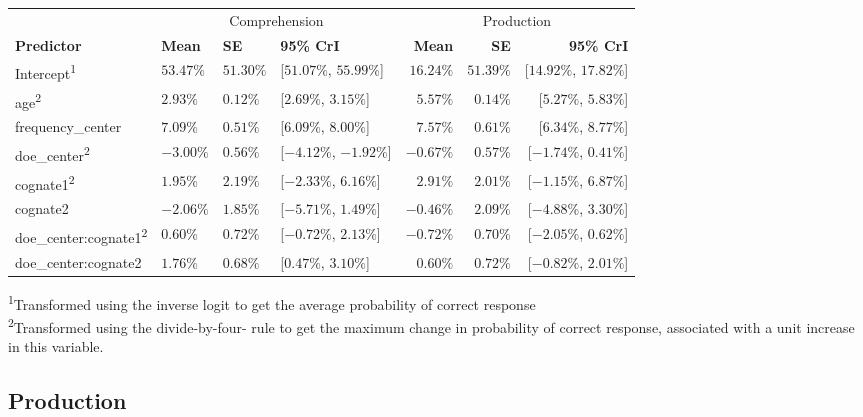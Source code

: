 \documentclass[
  english,
  man,man,floatsintext]{apa6}
\begin{document}
\captionsetup[table]{labelformat=empty,skip=1pt}
\begin{longtable}{llllrrr}
\toprule
& \multicolumn{3}{c}{Comprehension} & \multicolumn{3}{c}{Production} \\ 
 \cmidrule(lr){2-4}\cmidrule(lr){5-7}
\textbf{Predictor} & \textbf{Mean} & \textbf{SE} & \textbf{95\% CrI} & \textbf{Mean} & \textbf{SE} & \textbf{95\% CrI} \\ 
\midrule
Intercept\textsuperscript{1} & $53.47\%$ & $51.30\%$ & [$51.07\%$, $55.99\%$] & $16.24\%$ & $51.39\%$ & [$14.92\%$, $17.82\%$] \\ 
age\textsuperscript{2} & $2.93\%$ & $0.12\%$ & [$2.69\%$, $3.15\%$] & $5.57\%$ & $0.14\%$ & [$5.27\%$, $5.83\%$] \\ 
frequency\_center & $7.09\%$ & $0.51\%$ & [$6.09\%$, $8.00\%$] & $7.57\%$ & $0.61\%$ & [$6.34\%$, $8.77\%$] \\ 
doe\_center\textsuperscript{2} & $-3.00\%$ & $0.56\%$ & [$-4.12\%$, $-1.92\%$] & $-0.67\%$ & $0.57\%$ & [$-1.74\%$, $0.41\%$] \\ 
cognate1\textsuperscript{2} & $1.95\%$ & $2.19\%$ & [$-2.33\%$, $6.16\%$] & $2.91\%$ & $2.01\%$ & [$-1.15\%$, $6.87\%$] \\ 
cognate2 & $-2.06\%$ & $1.85\%$ & [$-5.71\%$, $1.49\%$] & $-0.46\%$ & $2.09\%$ & [$-4.88\%$, $3.30\%$] \\ 
doe\_center:cognate1\textsuperscript{2} & $0.60\%$ & $0.72\%$ & [$-0.72\%$, $2.13\%$] & $-0.72\%$ & $0.70\%$ & [$-2.05\%$, $0.62\%$] \\ 
doe\_center:cognate2 & $1.76\%$ & $0.68\%$ & [$0.47\%$, $3.10\%$] & $0.60\%$ & $0.72\%$ & [$-0.82\%$, $2.01\%$] \\ 
\bottomrule
\end{longtable}
\vspace{-5mm}
\begin{minipage}{\linewidth}
\textsuperscript{1}Transformed using the inverse logit to get the average probability of correct response \\ 
\textsuperscript{2}Transformed using the divide-by-four- rule to get the maximum change in probability of correct response, associated with a unit increase in this variable. \\ 
\end{minipage}

\hypertarget{production}{%
\subsection{Production}\label{production}}
\end{document}

